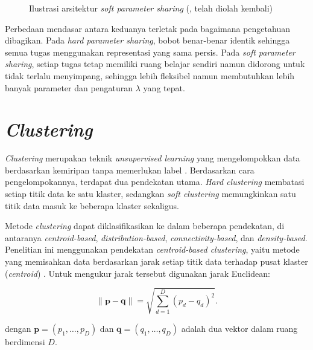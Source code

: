 \begin{figure}[H]
\caption{Ilustrasi arsitektur \textit{soft parameter sharing}
(\cite{ruder2017overview}, telah diolah kembali)}
\label{fig:soft_sharing}
\end{figure}

Perbedaan mendasar antara keduanya terletak pada bagaimana pengetahuan
dibagikan. Pada \textit{hard parameter sharing}, bobot benar-benar identik
sehingga semua tugas menggunakan representasi yang sama persis. Pada
\textit{soft parameter sharing}, setiap tugas tetap memiliki ruang belajar
sendiri namun didorong untuk tidak terlalu menyimpang, sehingga lebih
fleksibel namun membutuhkan lebih banyak parameter dan pengaturan
$\lambda$ yang tepat.

\section{\textit{Clustering}}

\textit{Clustering} merupakan teknik \textit{unsupervised learning} yang
mengelompokkan data berdasarkan kemiripan tanpa memerlukan label
\parencite{bezdek1984}. Berdasarkan cara pengelompokannya, terdapat dua
pendekatan utama. \textit{Hard clustering} membatasi setiap titik data ke
satu klaster, sedangkan \textit{soft clustering} memungkinkan satu titik
data masuk ke beberapa klaster sekaligus.

Metode \textit{clustering} dapat diklasifikasikan ke dalam beberapa
pendekatan, di antaranya \textit{centroid-based}, \textit{distribution-based},
\textit{connectivity-based}, dan \textit{density-based}. Penelitian ini
menggunakan pendekatan \textit{centroid-based clustering}, yaitu metode yang
memisahkan data berdasarkan jarak setiap titik data terhadap pusat klaster
(\textit{centroid}) \parencite{yusdiansyah2019}. Untuk mengukur jarak
tersebut digunakan jarak Euclidean:

\begin{equation}
    \|\mathbf{p} - \mathbf{q}\| =
    \sqrt{\sum_{d=1}^{D}(p_d - q_d)^2}.
    \label{eq:euclidean_distance}
\end{equation}

\noindent dengan $\mathbf{p} = (p_1, \ldots, p_D)$ dan
$\mathbf{q} = (q_1, \ldots, q_D)$ adalah dua vektor dalam ruang
berdimensi $D$.

